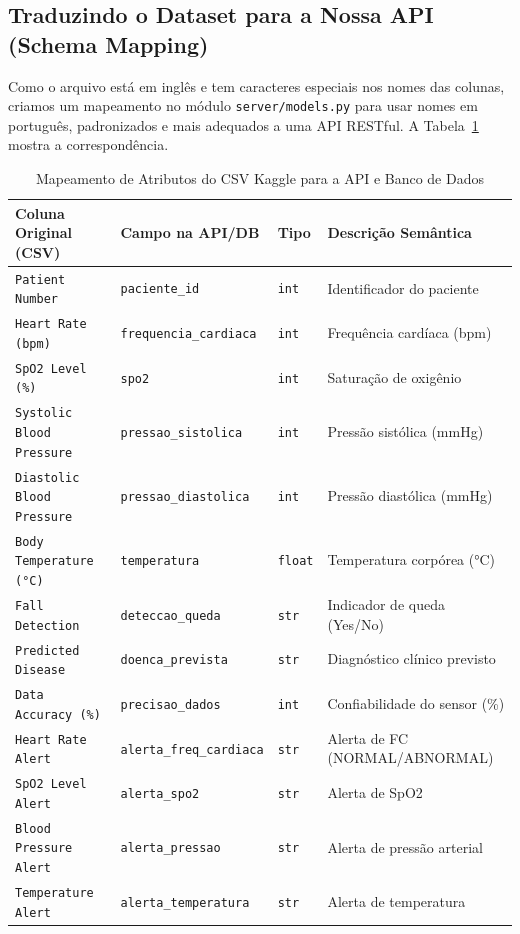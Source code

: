 \documentclass[12pt,a4paper]{article}
\begin{document}
	\subsection{Traduzindo o Dataset para a Nossa API (Schema Mapping)}
	Como o arquivo está em inglês e tem caracteres especiais nos nomes das colunas, criamos um mapeamento no módulo \texttt{server/models.py} para usar nomes em português, padronizados e mais adequados a uma API RESTful. A Tabela~\ref{tab:schema_map} mostra a correspondência.
	
	\begin{table}[H]
		\centering
		\footnotesize
		\caption{Mapeamento de Atributos do CSV Kaggle para a API e Banco de Dados}
		\label{tab:schema_map}
		\begin{tabularx}{\textwidth}{p{4.2cm} p{4.2cm} p{1.2cm} X}
			\toprule
			\textbf{Coluna Original (CSV)} & \textbf{Campo na API/DB} & \textbf{Tipo} & \textbf{Descrição Semântica} \\
			\midrule
			\texttt{Patient Number} & \texttt{paciente\_id} & \texttt{int} & Identificador do paciente \\
			\texttt{Heart Rate (bpm)} & \texttt{frequencia\_cardiaca} & \texttt{int} & Frequência cardíaca (bpm) \\
			\texttt{SpO2 Level (\%)} & \texttt{spo2} & \texttt{int} & Saturação de oxigênio \\
			\texttt{Systolic Blood Pressure} & \texttt{pressao\_sistolica} & \texttt{int} & Pressão sistólica (mmHg) \\
			\texttt{Diastolic Blood Pressure} & \texttt{pressao\_diastolica} & \texttt{int} & Pressão diastólica (mmHg) \\
			\texttt{Body Temperature (°C)} & \texttt{temperatura} & \texttt{float} & Temperatura corpórea (°C) \\
			\texttt{Fall Detection} & \texttt{deteccao\_queda} & \texttt{str} & Indicador de queda (Yes/No) \\
			\texttt{Predicted Disease} & \texttt{doenca\_prevista} & \texttt{str} & Diagnóstico clínico previsto \\
			\texttt{Data Accuracy (\%)} & \texttt{precisao\_dados} & \texttt{int} & Confiabilidade do sensor (\%) \\
			\texttt{Heart Rate Alert} & \texttt{alerta\_freq\_cardiaca} & \texttt{str} & Alerta de FC (NORMAL/ABNORMAL) \\
			\texttt{SpO2 Level Alert} & \texttt{alerta\_spo2} & \texttt{str} & Alerta de SpO2 \\
			\texttt{Blood Pressure Alert} & \texttt{alerta\_pressao} & \texttt{str} & Alerta de pressão arterial \\
			\texttt{Temperature Alert} & \texttt{alerta\_temperatura} & \texttt{str} & Alerta de temperatura \\
			\bottomrule
		\end{tabularx}
	\end{table}
	
\end{document}
